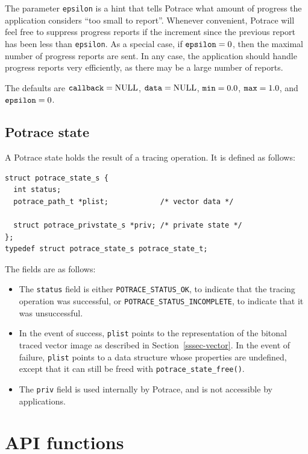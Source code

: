 \documentclass{article}
\begin{document}
The parameter \verb!epsilon! is a hint that tells Potrace what amount of
progress the application considers ``too small to report''. Whenever
convenient, Potrace will feel free to suppress progress reports if the
increment since the previous report has been less than \verb!epsilon!.  As
a special case, if $\verb!epsilon!=0$, then the maximal number of progress
reports are sent. In any case, the application should handle progress
reports very efficiently, as there may be a large number of reports. 

The defaults are $\verb!callback!=\textrm{NULL}$,
$\verb!data!=\textrm{NULL}$, $\verb!min!=0.0$, $\verb!max!=1.0$, and
$\verb!epsilon!=0$.

\subsection{Potrace state}\label{4}

A Potrace state holds the result of a tracing operation. It is
defined as follows:

\begin{verbatim}
struct potrace_state_s {
  int status;
  potrace_path_t *plist;            /* vector data */

  struct potrace_privstate_s *priv; /* private state */
};
typedef struct potrace_state_s potrace_state_t;
\end{verbatim}

The fields are as follows:
\begin{itemize}
\item The \verb!status! field is either \verb!POTRACE_STATUS_OK!, to
  indicate that the tracing operation was successful, or
  \verb!POTRACE_STATUS_INCOMPLETE!, to indicate that it was
  unsuccessful.
\item In the event of success, \verb!plist! points to the
  representation of the bitonal traced vector image as described in
  Section~\ref{sssec-vector}.  In the event of failure, \verb!plist!
  points to a data structure whose properties are undefined, except
  that it can still be freed with \verb!potrace_state_free()!.
\item The \verb!priv! field is used internally by Potrace, and is not
  accessible by applications.
\end{itemize}

\section{API functions}\label{5}
\end{document}
